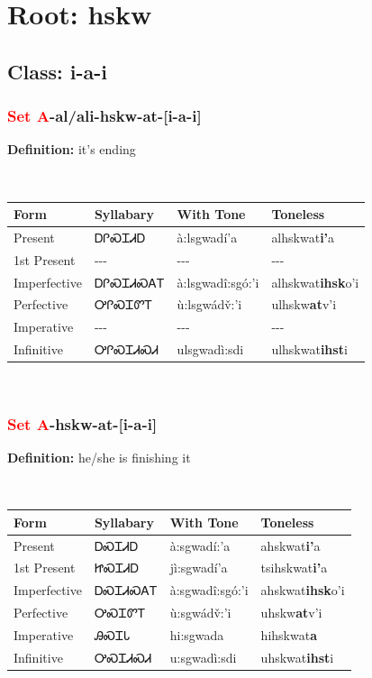 \needspace{4in}
\section*{Root: hskw}
\nopagebreak
{}
\needspace{3in}
\subsection*{Class: i-a-i}
\nopagebreak
\needspace{2in}
\subsubsection*{\textcolor{Red}{Set A}{-}al/ali{-}\textbf{hskw}{-}at{-}[i-a-i]}
\nopagebreak
\textbf{Definition: } it{\textquoteright}s ending
\\[0.5em]
\begin{tabularx}{\textwidth}{l X X X}%
\toprule%
\textbf{Form}&\textbf{Syllabary}&\textbf{With Tone}&\textbf{Toneless}\\%
\midrule%
Present&ᎠᎵᏍᏆᏗᎠ&à:lsgwadí’a&alhskwat\textbf{i'}a\\%
1st Present&{-}{-}{-}&{-}{-}{-}&{-}{-}{-}\\%
Imperfective&ᎠᎵᏍᏆᏗᏍᎪᎢ&à:lsgwadî:sgó:’i&alhskwat\textbf{ihsk}o'i\\%
Perfective&ᎤᎵᏍᏆᏛᎢ&ù:lsgwádv̌:’i&ulhskw\textbf{at}v'i\\%
Imperative&{-}{-}{-}&{-}{-}{-}&{-}{-}{-}\\%
Infinitive&ᎤᎵᏍᏆᏗᏍᏗ&ulsgwadì:sdi&ulhskwat\textbf{ihst}i\\%
\bottomrule%
\end{tabularx}
\\[1em]
\needspace{2in}
\subsubsection*{\textcolor{Red}{Set A}{-}\textbf{hskw}{-}at{-}[i-a-i]}
\nopagebreak
\textbf{Definition: } he/she is finishing it
\\[0.5em]
\begin{tabularx}{\textwidth}{l X X X}%
\toprule%
\textbf{Form}&\textbf{Syllabary}&\textbf{With Tone}&\textbf{Toneless}\\%
\midrule%
Present&ᎠᏍᏆᏗᎠ&à:sgwadí:’a&ahskwat\textbf{i'}a\\%
1st Present&ᏥᏍᏆᏗᎠ&jì:sgwadí’a&tsihskwat\textbf{i'}a\\%
Imperfective&ᎠᏍᏆᏗᏍᎪᎢ&à:sgwadî:sgó:’i&ahskwat\textbf{ihsk}o'i\\%
Perfective&ᎤᏍᏆᏛᎢ&ù:sgwádv̌:’i&uhskw\textbf{at}v'i\\%
Imperative&ᎯᏍᏆᏓ&hi:sgwada&hihskwat\textbf{a}\\%
Infinitive&ᎤᏍᏆᏗᏍᏗ&u:sgwadì:sdi&uhskwat\textbf{ihst}i\\%
\bottomrule%
\end{tabularx}
\\[1em]